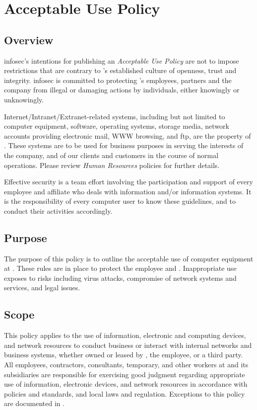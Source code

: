 \chapter{Acceptable Use Policy}
\CommonIntroduction

\section{Overview}
\gls{infosec}'s intentions for publishing an \textsl{Acceptable Use Policy} are not to impose restrictions that are contrary to \CompanyName{}'s established culture of openness, trust and integrity.  
\gls{infosec} is committed to protecting \CompanyName{}'s employees, partners and the company from illegal or damaging actions by individuals, either knowingly or unknowingly.  

Internet/Intranet/Extranet-related systems, including but not limited to computer equipment, software, operating systems, storage media, network accounts providing electronic mail, WWW browsing, and \gls{ftp}, are the property of \CompanyName{}.  
These systems are to be used for business purposes in serving the interests of the company, and of our clients and customers in the course of normal operations.  
Please review \textsl{Human Resources} policies for further details.

Effective security is a team effort involving the participation and support of every \CompanyName{} employee and affiliate who deals with information and/or information systems. It is the responsibility of every computer user to know these guidelines, and to conduct their activities accordingly.

\section{Purpose}
The purpose of this policy is to outline the acceptable use of computer equipment at \CompanyName{}.  
These rules are in place to protect the employee and \CompanyName{}.  
Inappropriate use exposes \CompanyName{} to risks including virus attacks, compromise of network systems and services, and legal issues.  

\section{Scope}
This policy applies to the use of information, electronic and computing devices, and network resources to conduct \CompanyName{} business or interact with internal networks and business systems, whether owned or leased by \CompanyName{}, the employee, or a third party.  
All employees, contractors, consultants, temporary, and other workers at \CompanyName{} and its subsidiaries are responsible for exercising good judgment regarding appropriate use of information, electronic devices, and network resources in accordance with \CompanyName{} policies and standards, and local laws and regulation.
Exceptions to this policy are documented in .

